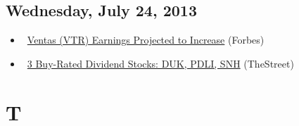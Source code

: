 \documentclass[11pt,asymmetric]{article}
\begin{document}
\subsection*{Wednesday, July 24, 2013}
\begin{itemize}
\item\ \href{http://www.forbes.com/sites/narrativescience/2013/07/24/ventas-vtr-earnings-projected-to-increase/?partner=yahootix}{Ventas (VTR) Earnings Projected to Increase} (Forbes)
\item\ \href{http://www.thestreet.com/story/11987931/1/3-buy-rated-dividend-stocks-duk-pdli-snh.html?puc=yahoo&cm_ven=YAHOO}{3 Buy-Rated Dividend Stocks: DUK, PDLI, SNH} (TheStreet)
\end{itemize}

\section*{T}
\end{document}
